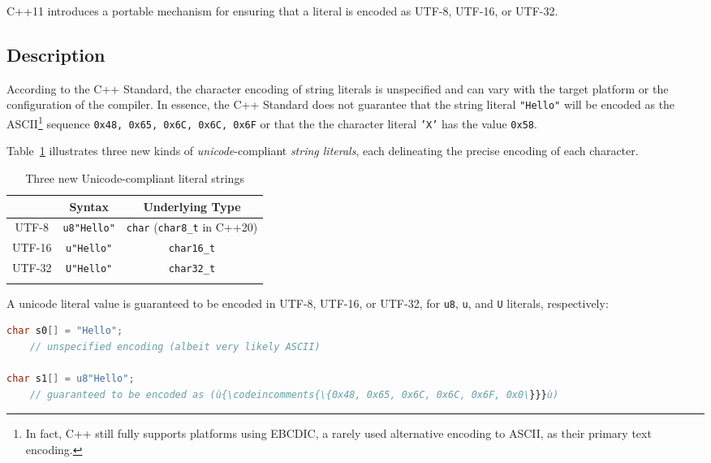 
C++11 introduces a portable mechanism for ensuring that a literal is
encoded as UTF-8, UTF-16, or UTF-32.

\subsection[Description]{Description}\label{description-unicodestring}

According to the C++ Standard, the character encoding of string literals
is unspecified and can vary with the target platform or the configuration of
the compiler. In essence, the C++ Standard does not guarantee that the
string literal \texttt{"Hello"} will be encoded as the
ASCII{\cprotect\footnote{In fact, C++ still fully supports platforms
  using EBCDIC, a rarely used alternative encoding to ASCII, as their primary text encoding.}} sequence
\texttt{{0x48,} \texttt{0x65,} \texttt{0x6C,} \texttt{0x6C,} \texttt{0x6F}}
or that the the character literal \texttt{'X'} has the value
\texttt{0x58}.

Table~\ref{unicodestring-table1} illustrates three new kinds of \emph{unicode}-compliant
\emph{string literals}, each delineating the precise encoding of each
character.
 \begin{table}[h!]
\begin{center}
\begin{threeparttable}
\caption{Three new Unicode-compliant literal strings}\label{unicodestring-table1}\vspace{1.5ex}
{\small \begin{tabular}{c|c|c}\thickhline
\rowcolor[gray]{.9}{\sffamily\bfseries Encoding} & {\sffamily\bfseries Syntax} & {\sffamily\bfseries Underlying Type}\\ \hline
UTF-8   &  \texttt{u8"Hello"} & \texttt{char} (\texttt{char8\_t} in C++20) \\ \hline
UTF-16 & \texttt{u"Hello"}  & \texttt{char16\_t} \\ \hline
UTF-32  & \texttt{U"Hello"} & \texttt{char32\_t}\\ \thickhline
\end{tabular}
} %
\end{threeparttable}
\end{center} 
\end{table} 

\noindent A unicode literal value is guaranteed to be encoded in UTF-8, UTF-16, or
UTF-32, for \texttt{u8}, \texttt{u}, and \texttt{U} literals,
respectively:

\begin{lstlisting}[language=C++]
char s0[] = "Hello";
    // unspecified encoding (albeit very likely ASCII)

char s1[] = u8"Hello";
    // guaranteed to be encoded as (ù{\codeincomments{\{0x48, 0x65, 0x6C, 0x6C, 0x6F, 0x0\}}}ù)
\end{lstlisting}
    
